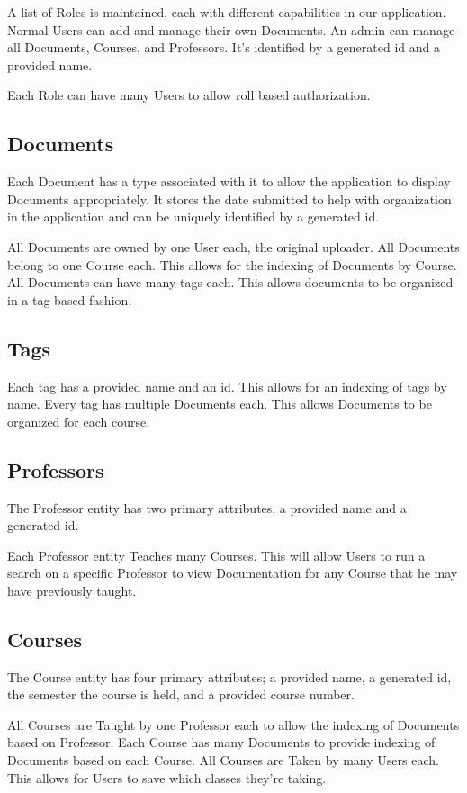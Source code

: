 \documentclass[11pt]{article}
\begin{document}
   A list of Roles is maintained, each with different capabilities in
   our application.  Normal Users can add and manage their own
   Documents. An admin can manage all Documents, Courses, and
   Professors.  It's identified by a generated id and a provided name.

   Each Role can have many Users to allow roll based authorization.
\subsection{Documents}
\label{sec-2-3}


   Each Document has a type associated with it to allow the
   application to display Documents appropriately. It stores the date
   submitted to help with organization in the application and can be
   uniquely identified by a generated id.

   All Documents are owned by one User each, the original
   uploader. All Documents belong to one Course each. This allows for
   the indexing of Documents by Course. All Documents can have many
   tags each. This allows documents to be organized in a tag based
   fashion.
\subsection{Tags}
\label{sec-2-4}


   Each tag has a provided name and an id. This allows for an indexing
   of tags by name.  Every tag has multiple Documents each. This
   allows Documents to be organized for each course.
\subsection{Professors}
\label{sec-2-5}


   The Professor entity has two primary attributes, a provided name
   and a generated id.
   
   Each Professor entity Teaches many Courses. This will allow Users
   to run a search on a specific Professor to view Documentation for
   any Course that he may have previously taught.
\subsection{Courses}
\label{sec-2-6}


   The Course entity has four primary attributes; a provided name, a
   generated id, the semester the course is held, and a provided
   course number.

   All Courses are Taught by one Professor each to allow the indexing of
   Documents based on Professor. Each Course has many Documents to
   provide indexing of Documents based on each Course. All Courses
   are Taken by many Users each. This allows for Users to save which
   classes they're taking.
\end{document}
